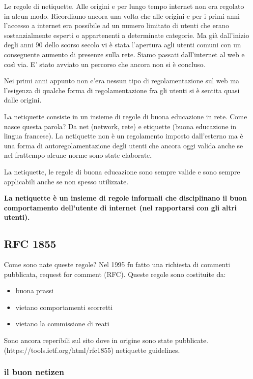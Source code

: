 Le regole di netiquette. Alle origini e per lungo tempo internet non era regolato in alcun modo. Ricordiamo ancora una volta che alle origini e per i primi anni l'accesso a internet era possibile ad un numero limitato di utenti che erano sostanzialmente esperti o appartenenti a determinate categorie. Ma già dall'inizio degli anni 90 dello scorso secolo vi è stata l'apertura agli utenti comuni con un conseguente aumento di presenze sulla rete. Siamo passati dall'internet al web e così via. E' stato avviato un percorso che ancora non si è concluso.\par
Nei primi anni appunto non c'era nessun tipo di regolamentazione sul web ma l'esigenza di qualche forma di regolamentazione fra gli utenti si è sentita quasi dalle origini.\par
La netiquette consiste in un insieme di regole di buona educazione in rete. Come nasce questa parola? Da net (network, rete) e etiquette (buona educazione in lingua francese). La netiquette non è un regolamento imposto dall'esterno ma è una forma di autoregolamentazione degli utenti che ancora oggi valida anche se nel frattempo alcune norme sono state elaborate.\par
La netiquette, le regole di buona educazione sono sempre valide e sono sempre applicabili anche se non spesso utilizzate.\par
\textbf{La netiquette è un insieme di regole informali che disciplinano il buon comportamento dell'utente di internet (nel rapportarsi con gli altri utenti).}\par

\subsection{RFC 1855}
Come sono nate queste regole? Nel 1995 fu fatto una richiesta di commenti pubblicata, request for comment (RFC). Queste regole sono costituite da:

\begin{itemize}
    \item buona prassi
    \item vietano comportamenti scorretti
    \item vietano la commissione di reati
\end{itemize}

Sono ancora reperibili sul sito dove in origine sono state pubblicate. (https://tools.ietf.org/html/rfc1855) netiquette guidelines.\par

\subsubsection{il buon netizen}

